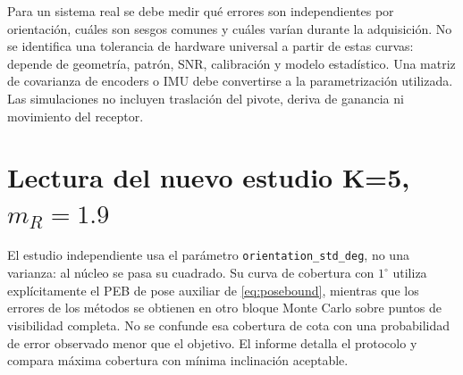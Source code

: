 \documentclass[11pt,a4paper]{article}
\begin{document}
Para un sistema real se debe medir qué errores son independientes por orientación, cuáles son sesgos comunes y cuáles varían durante la adquisición. No se identifica una tolerancia de hardware universal a partir de estas curvas: depende de geometría, patrón, SNR, calibración y modelo estadístico. Una matriz de covarianza de encoders o IMU debe convertirse a la parametrización utilizada. Las simulaciones no incluyen traslación del pivote, deriva de ganancia ni movimiento del receptor.

\section{Lectura del nuevo estudio K=5, \texorpdfstring{$m_R=1.9$}{mR=1.9}}
El estudio independiente  usa el parámetro \texttt{orientation\_std\_deg}, no una varianza: al núcleo se pasa su cuadrado. Su curva de cobertura con $1^\circ$ utiliza explícitamente el PEB de pose auxiliar de \eqref{eq:posebound}, mientras que los errores de los métodos se obtienen en otro bloque Monte Carlo sobre puntos de visibilidad completa. No se confunde esa cobertura de cota con una probabilidad de error observado menor que el objetivo. El informe  detalla el protocolo y compara máxima cobertura con mínima inclinación aceptable.



\end{document}
